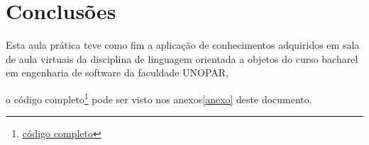 \section{Conclusões}

\par Esta aula prática teve como fim a aplicação de conhecimentos adquiridos em sala de aula virtuais da disciplina de linguagem orientada a objetos do curso bacharel em engenharia de software da faculdade UNOPAR,

o código completo\footnote{\hyperref[anexo]{código completo}}  pode ser visto nos anexos\ref{anexo} deste documento.

